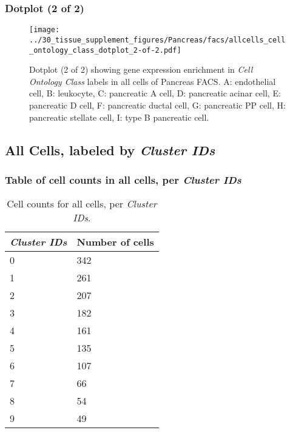 \clearpage

\subsubsection{Dotplot (2 of 2)}
\begin{figure}[h]
\centering
\texttt{[image: ../30\_tissue\_supplement\_figures/Pancreas/facs/allcells\_cell\_ontology\_class\_dotplot\_2-of-2.pdf]}

\caption{ Dotplot (2 of 2)  showing gene expression enrichment in \emph{Cell Ontology Class} labels in all cells of Pancreas FACS. A: endothelial cell, B: leukocyte, C: pancreatic A cell, D: pancreatic acinar cell, E: pancreatic D cell, F: pancreatic ductal cell, G: pancreatic PP cell, H: pancreatic stellate cell, I: type B pancreatic cell.}
\end{figure}


\clearpage

\subsection{All Cells, labeled by \emph{Cluster IDs}}
\subsubsection{Table of cell counts in all cells, per \emph{Cluster IDs}}\begin{table}[h]
\centering
\label{my-label}
\begin{tabular}{@{}ll@{}}
\toprule

\emph{Cluster IDs}& Number of cells \\ \midrule
0 & 342 \\

1 & 261 \\

2 & 207 \\

3 & 182 \\

4 & 161 \\

5 & 135 \\

6 & 107 \\

7 & 66 \\

8 & 54 \\

9 & 49 \\
\bottomrule
\end{tabular}
\caption{Cell counts for all cells, per \emph{Cluster IDs}.}
\end{table}

